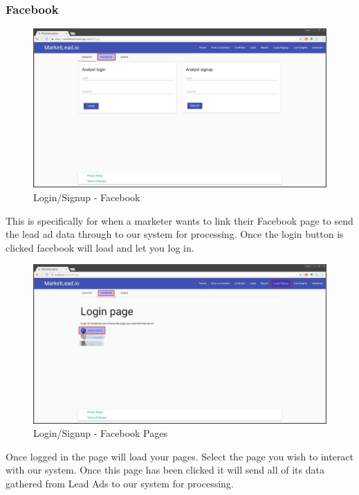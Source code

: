 \documentclass{article}
\begin{document}
			\subsubsection{Facebook}
				\begin{figure}[H]
					\includegraphics[width=\textwidth]{images/login_signup_facebook.jpg}
					\caption{Login/Signup - Facebook}
					\label{fig:loginSignupFacebook}
				\end{figure}
				This is specifically for when a marketer wants to link their Facebook page to send the lead ad data through to our system for processing.
				Once the login button is clicked facebook will load and let you log in.

				\begin{figure}[H]
					\includegraphics[width=\textwidth]{images/login_signup_facebook_pages.jpg}
					\caption{Login/Signup - Facebook Pages}
					\label{fig:loginSignupFacebookPages}
				\end{figure}
				Once logged in the page will load your pages. Select the page you wish to interact with our system.
				Once this page has been clicked it will send all of its data gathered from Lead Ads to our system for processing.
\end{document}
